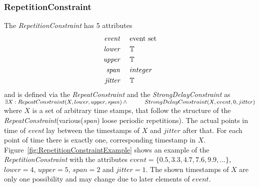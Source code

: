 	\subsubsection{RepetitionConstraint}
		The \emph{RepetitionConstraint} has 5 attributes
		\begin{align*}
			\emph{event} & \hspace{.5cm}\text{event set}\\
			\emph{lower} & \hspace{.5cm}\text{$\mathbb{T}$}\\
			\emph{upper} & \hspace{.5cm}\text{$\mathbb{T}$}\\
			\emph{span}	 & \hspace{.5cm}\text{$integer$}\\
			\emph{jitter}& \hspace{.5cm}\mathbb{T}
		\end{align*}
		and is defined via the \emph{RepeatConstraint} and the \emph{StrongDelayConstraint} as\\[10pt]
		\begin{math}
			\exists X: RepeatConstraint(X, lower, upper, span) \land \\
			\text{\hspace{1cm}}StrongDelayConstraint(X, event, 0, jitter)
		\end{math}\\[10pt]
		where $X$ is a set of arbitrary time stamps, that follow the structure of the \emph{RepeatConstraint}(various(\emph{span}) loose periodic repetitions). The actual points in time of \emph{event} lay between the timestamps of $X$ and $jitter$ after that. For each point of time there is exactly one, corresponding timestamp in $X$.
		Figure~\ref{fig:RepetitionConstraintExample} shows an example of the \emph{RepetitionConstraint} with the attributes $event=\{0.5, 3.3, 4.7, 7.6, 9.9, ...\}$, $lower=4$, $upper=5$, $span=2$ and $jitter=1$. The shown timestamps of $X$ are only one possibility and may change due to later elements of $event$.
		
